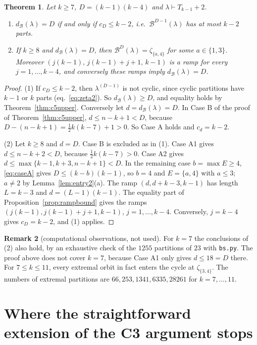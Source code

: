 \documentclass[11pt]{article}
\newtheorem{theorem}{Theorem}[section]
\theoremstyle{definition}
\newtheorem{remark}[theorem]{Remark}
\newcommand{\B}{\mathcal{B}}
\newcommand{\dB}{d_{\mathcal{B}}}
\renewcommand{\le}{\leqslant}
\renewcommand{\ge}{\geqslant}
\begin{document}
\begin{theorem}\label{thm:c5ext}
Let $k\ge7$, $D=(k-1)(k-4)$ and $\lambda\vdash T_{k-1}+2$.
\begin{enumerate}
\item[(1)] $\dB(\lambda)=D$ if and only if $c_D\le k-2$, i.e.\ $\B^{D-1}(\lambda)$ has at most $k-2$ parts.
\item[(2)] If $k\ge8$ and $\dB(\lambda)=D$, then $\B^{D}(\lambda)=\zeta_{\{a,4\}}$ for some $a\in\{1,3\}$.  Moreover
$(j(k-1),\,j(k-1)+j+1,\,k-1)$ is a ramp for every $j=1,\dots,k-4$, and conversely these ramps imply $\dB(\lambda)=D$.
\end{enumerate}
\end{theorem}
\begin{proof}
(1) If $c_D\le k-2$, then $\lambda^{(D-1)}$ is not cyclic, since cyclic partitions have $k-1$ or $k$ parts
(eq.~\eqref{eq:zeta2}).  So $\dB(\lambda)\ge D$, and equality holds by Theorem~\ref{thm:c5upper}.  Conversely let $d=\dB(\lambda)=D$.
In Case B of the proof of Theorem~\ref{thm:c5upper}, $d\le n-k+1<D$, because $D-(n-k+1)=\frac12k(k-7)+1>0$.  So Case A
holds and $c_d=k-2$.

(2) Let $k\ge8$ and $d=D$.  Case B is excluded as in (1).  Case A1 gives $d\le n-k+2<D$, because $\frac12k(k-7)>0$.  Case A2
gives $d\le\max\{k-1,k+3,n-k+1\}<D$.  In the remaining case $b=\max E\ge4$, \eqref{eq:caseA} gives $D\le(k-b)(k-1)$, so
$b=4$ and $E=\{a,4\}$ with $a\le3$; $a\ne2$ by Lemma~\ref{lem:entry2}(a).  The ramp $(d,d+k-3,k-1)$ has length $L=k-3$ and $d=(L-1)(k-1)$.  The equality
part of Proposition~\ref{prop:rampbound} gives the ramps $(j(k-1),j(k-1)+j+1,k-1)$, $j=1,\dots,k-4$.  Conversely,
$j=k-4$ gives $c_D=k-2$, and (1) applies.
\end{proof}

\begin{remark}[computational observations, not used]
For $k=7$ the conclusions of (2) also hold, by an exhaustive check of the $1255$ partitions of $23$ with
\texttt{bs.py}.  The proof above does not cover $k=7$, because Case A1 only gives $d\le18=D$ there.  For
$7\le k\le11$, every extremal orbit in fact enters the cycle at $\zeta_{\{3,4\}}$.  The numbers of extremal partitions
are $66,253,1341,6335,28261$ for $k=7,\dots,11$.
\end{remark}

\section{Where the straightforward extension of the C3 argument stops}\label{sec:c5loss}
\end{document}
